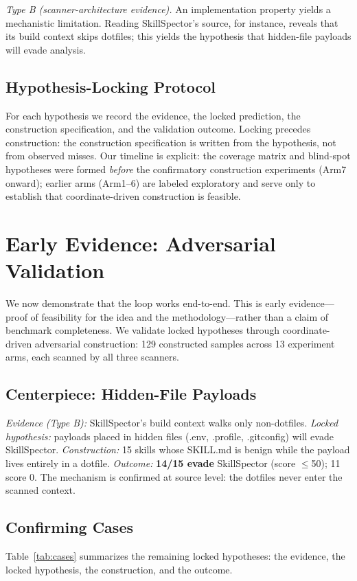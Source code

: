 \documentclass[sigconf,nonacm]{acmart}
\begin{document}
\emph{Type B (scanner-architecture evidence).} An implementation property yields a mechanistic limitation. Reading SkillSpector's source, for instance, reveals that its build context skips dotfiles; this yields the hypothesis that hidden-file payloads will evade analysis.

\subsection{Hypothesis-Locking Protocol}
For each hypothesis we record the evidence, the locked prediction, the construction specification, and the validation outcome. Locking precedes construction: the construction specification is written from the hypothesis, not from observed misses. Our timeline is explicit: the coverage matrix and blind-spot hypotheses were formed \emph{before} the confirmatory construction experiments (Arm7 onward); earlier arms (Arm1--6) are labeled exploratory and serve only to establish that coordinate-driven construction is feasible.

\section{Early Evidence: Adversarial Validation}
\label{sec:validate}

We now demonstrate that the loop works end-to-end. This is early evidence---proof of feasibility for the idea and the methodology---rather than a claim of benchmark completeness. We validate locked hypotheses through coordinate-driven adversarial construction: 129 constructed samples across 13 experiment arms, each scanned by all three scanners.

\subsection{Centerpiece: Hidden-File Payloads}
\emph{Evidence (Type B):} SkillSpector's build context walks only non-dotfiles.
\emph{Locked hypothesis:} payloads placed in hidden files (.env, .profile, .gitconfig) will evade SkillSpector.
\emph{Construction:} 15 skills whose SKILL.md is benign while the payload lives entirely in a dotfile.
\emph{Outcome:} \textbf{14/15 evade} SkillSpector (score $\le$50); 11 score 0. The mechanism is confirmed at source level: the dotfiles never enter the scanned context.

\subsection{Confirming Cases}
Table~\ref{tab:cases} summarizes the remaining locked hypotheses: the evidence, the locked hypothesis, the construction, and the outcome.
\end{document}
